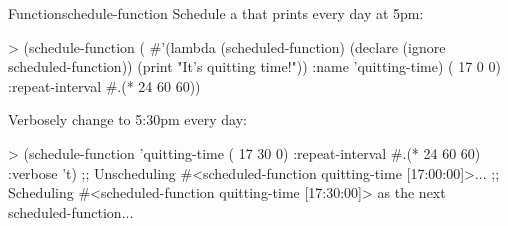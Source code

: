 \begin{functiondoc}{Function}{schedule-function}
%
%
Schedule a  that prints  
every day at 5pm:
\begin{example}
> (schedule-function
    (
      #'(lambda (scheduled-function)
          (declare (ignore scheduled-function))
          (print "It's quitting time!"))
      :name 'quitting-time)
     ( 17 0 0) :repeat-interval #.(* 24 60 60))
\end{example}

%
Verbosely change  to 5:30pm every day:
\begin{example}
> (schedule-function 'quitting-time ( 17 30 0)
    :repeat-interval #.(* 24 60 60)
    :verbose 't)
;; Unscheduling #<scheduled-function quitting-time [17:00:00]>...
;; Scheduling #<scheduled-function quitting-time [17:30:00]> 
   as the next scheduled-function...
\end{example}

\end{functiondoc}


